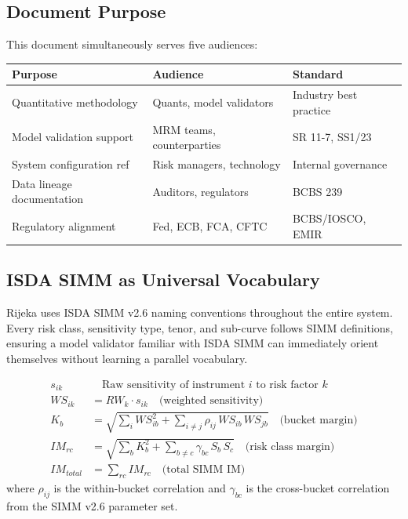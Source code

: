 \documentclass[11pt, a4paper]{article}
\begin{document}
\subsection{Document Purpose}

This document simultaneously serves five audiences:

\begin{center}
\begin{tabular}{L{4.5cm} L{4.5cm} L{4cm}}
\toprule
\textbf{Purpose} & \textbf{Audience} & \textbf{Standard} \\
\midrule
Quantitative methodology & Quants, model validators & Industry best practice \\
Model validation support & MRM teams, counterparties & SR 11-7, SS1/23 \\
System configuration ref & Risk managers, technology & Internal governance \\
Data lineage documentation & Auditors, regulators & BCBS 239 \\
Regulatory alignment & Fed, ECB, FCA, CFTC & BCBS/IOSCO, EMIR \\
\bottomrule
\end{tabular}
\end{center}

\subsection{ISDA SIMM as Universal Vocabulary}

Rijeka uses ISDA SIMM v2.6 naming conventions throughout the entire system.
Every risk class, sensitivity type, tenor, and sub-curve follows SIMM definitions,
ensuring a model validator familiar with ISDA SIMM can immediately orient themselves
without learning a parallel vocabulary.

\begin{tcolorbox}[important, title={SIMM Sensitivity Notation}]
\begin{align}
s_{ik}     &\quad \text{Raw sensitivity of instrument } i \text{ to risk factor } k \\
WS_{ik}    &= RW_k \cdot s_{ik} \quad \text{(weighted sensitivity)} \\
K_b        &= \sqrt{\sum_i WS_{ib}^2 + \sum_{i \neq j} \rho_{ij}\, WS_{ib}\, WS_{jb}}
             \quad \text{(bucket margin)} \\
IM_{rc}    &= \sqrt{\sum_b K_b^2 + \sum_{b \neq c} \gamma_{bc}\, S_b\, S_c}
             \quad \text{(risk class margin)} \\
IM_{total} &= \sum_{rc} IM_{rc} \quad \text{(total SIMM IM)}
\end{align}
where $\rho_{ij}$ is the within-bucket correlation and $\gamma_{bc}$ is the
cross-bucket correlation from the SIMM v2.6 parameter set.
\end{tcolorbox}
\end{document}
